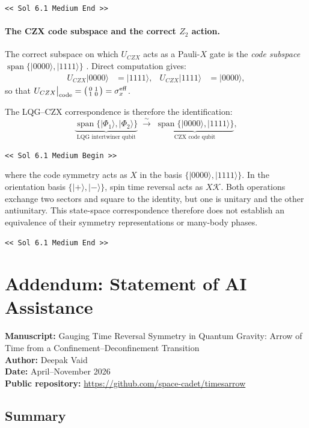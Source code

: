 \documentclass[preprint]{SciPost}
\newcommand{\ket}[1]{\vert #1 \rangle}
\theoremstyle{plain} %
\newcommand{\GPTBegin}{\par\noindent\textcolor{GPTMarker}{\texttt{\textless\textless{} Sol 6.1 Medium Begin \textgreater\textgreater}}\par}
\newcommand{\GPTEnd}{\par\noindent\textcolor{GPTMarker}{\texttt{\textless\textless{} Sol 6.1 Medium End \textgreater\textgreater}}\par}
\begin{document}
\GPTEnd{}


\paragraph{The CZX code subspace and the correct $Z_2$ action.}
The correct subspace on which $U_{CZX}$ acts as a Pauli-$X$ gate is the \emph{code subspace} $\operatorname{span}\{\ket{0000},\ket{1111}\}$ \cite{Chen2010Local}. Direct computation gives:
\begin{align}
  U_{CZX}\ket{0000} &= \ket{1111}, & U_{CZX}\ket{1111} &= \ket{0000},
\end{align}
so that $U_{CZX}\big|_{\rm code} = \bigl(\begin{smallmatrix}0&1\\1&0\end{smallmatrix}\bigr) = \sigma_x^{\rm eff}$.

The LQG--CZX correspondence is therefore the identification:
\begin{equation}
  \underbrace{\operatorname{span}\{\ket{\Phi_1},\ket{\Phi_2}\}}_{\text{LQG intertwiner qubit}}
  \;\xrightarrow{\;\sim\;}\;
  \underbrace{\operatorname{span}\{\ket{0000},\ket{1111}\}}_{\text{CZX code qubit}},
\end{equation}
\GPTBegin{}

where the code symmetry acts as $X$ in the basis
$\{\ket{0000},\ket{1111}\}$. In the orientation basis
$\{\ket{+},\ket{-}\}$, spin time reversal acts as $X\mathcal K$.
Both operations exchange two sectors and square to the identity, but one
is unitary and the other antiunitary. This state-space correspondence
therefore does not establish an equivalence of their symmetry representations
or many-body phases.

\GPTEnd{}


\section*{Addendum: Statement of AI Assistance}

\noindent\textbf{Manuscript:} Gauging Time Reversal Symmetry in Quantum Gravity: Arrow of Time from a Confinement--Deconfinement Transition\\
\textbf{Author:} Deepak Vaid\\
\textbf{Date:} April--November 2026\\
\textbf{Public repository:} \url{https://github.com/space-cadet/timesarrow}

\subsection*{Summary}
\end{document}
